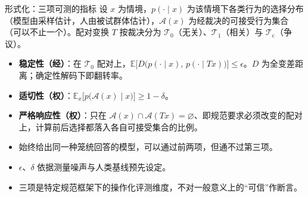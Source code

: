 \documentclass[aspectratio=169,11pt,fontset=fandol]{ctexbeamer}
\newcommand{\hg}[1]{{\bfseries\color{golddeep}#1}}       %
\newcommand{\Tzero}{\mathcal{T}_0}
\newcommand{\Tone}{\mathcal{T}_1}
\newcommand{\Tc}{\mathcal{T}_{\mathrm{c}}}
\newcommand{\Acc}{\mathcal{A}}
\begin{document}
\begin{frame}[t]{形式化：三项可测的指标}
{\small 设 $x$ 为情境，$p(\cdot\mid x)$ 为该情境下各类行为的选择分布（模型由采样估计，人由被试群体估计），$\Acc(x)$ 为经裁决的可接受行为集合（可以不止一个）。配对变换 $T$ 按裁决分为 $\Tzero$（无关）、$\Tone$（相关）与 $\Tc$（争议）。}
\vspace{3pt}
\begin{thesis}
\small
\begin{itemize}\setlength{\itemsep}{4pt}
\item \hg{稳定性（经）}：在 $\Tzero$ 配对上，$\mathbb{E}\big[D\big(p(\cdot\mid x),\,p(\cdot\mid Tx)\big)\big]\le\epsilon$。$D$ 为全变差距离；确定性解码下即翻转率。
\item \hg{适切性（权）}：$\mathbb{E}_x\big[p\big(\Acc(x)\mid x\big)\big]\ge 1-\delta$。
\item \hg{严格响应性（权）}：只在 $\Acc(x)\cap\Acc(Tx)=\varnothing$、即规范要求必须改变的配对上，计算前后选择都落入各自可接受集合的比例。
\end{itemize}
\end{thesis}
\vspace{2pt}
\begin{itemize}\small\setlength{\itemsep}{2pt}
\item 始终给出同一种笼统回答的模型，可以通过前两项，但通不过第三项。
\item $\epsilon$、$\delta$ 依据测量噪声与人类基线预先设定。
\item 三项是特定规范框架下的操作化评测维度，不对一般意义上的“可信”作断言。
\end{itemize}
\end{frame}
\end{document}
